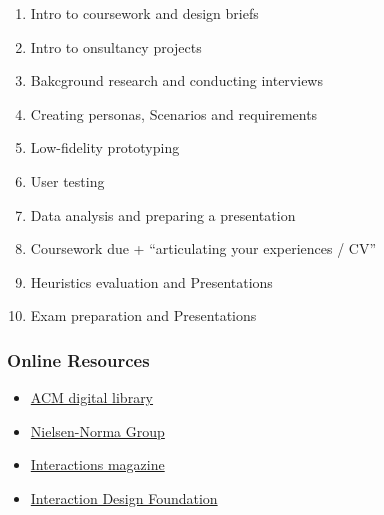 \documentclass[a4paper]{article}
\begin{document}
\begin{enumerate}
    \item Intro to coursework and design briefs
    \item Intro to onsultancy projects
    \item Bakcground research and conducting interviews
    \item Creating personas, Scenarios and requirements
    \item Low-fidelity prototyping
    \item User testing
    \item Data analysis and preparing a presentation
    \item Coursework due + ``articulating your experiences / CV''
    \item Heuristics evaluation and Presentations
    \item Exam preparation and Presentations
\end{enumerate}

\subsubsection{Online Resources}
\begin{itemize}
    \item \href{https://dl.acm.org}{ACM digital library}
    \item \href{https://www.nngroup.com/articles/}{Nielsen-Norma Group}
    \item \href{https://interactions.acm.org}{Interactions magazine}
    \item \href{https://www.interaction-design.org/}{Interaction Design Foundation}
\end{itemize}




\end{document}
